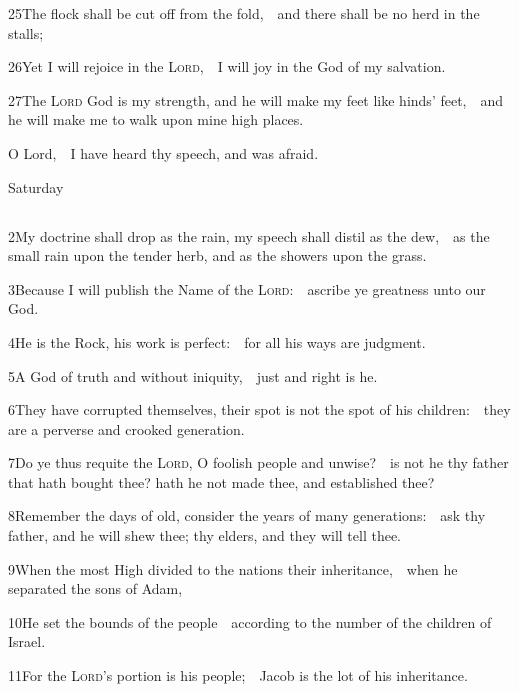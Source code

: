 25\enspace The flock shall be cut off from the fold,\ \star\ and there shall be no herd in the stalls;

26\enspace Yet I will rejoice in the {\scshape Lord},\ \star\ I will joy in the God of my salvation.

27\enspace The {\scshape Lord} God is my strength, and he will make my feet like hinds’ feet,\ \star\ and he will make me to walk upon mine high places.

 O Lord,\ \star\ I have heard thy speech, and was afraid.

\medskip

\centerline{Saturday}
\subsection{}


2\enspace My doctrine shall drop as the rain, my speech shall distil as the dew,\ \star\ as the small rain upon the tender herb, and as the showers upon the grass.

3\enspace Because I will publish the Name of the {\scshape Lord}:\ \star\ ascribe ye greatness unto our God.

4\enspace He is the Rock, his work is perfect:\ \star\ for all his ways are judgment.

5\enspace A God of truth and without iniquity,\ \star\ just and right is he.

6\enspace They have corrupted themselves, their spot is not the spot of his children:\ \star\ they are a perverse and crooked generation.

7\enspace Do ye thus requite the {\scshape Lord}, O foolish people and unwise?\ \star\ is not he thy father that hath bought thee? hath he not made thee, and established thee?

8\enspace Remember the days of old, consider the years of many generations:\ \star\ ask thy father, and he will shew thee; thy elders, and they will tell thee.

9\enspace When the most High divided to the nations their inheritance,\ \star\ when he separated the sons of Adam,

10\enspace He set the bounds of the people\ \star\ according to the number of the children of Israel.

11\enspace For the {\scshape Lord}’s portion is his people;\ \star\ Jacob is the lot of his inheritance.

